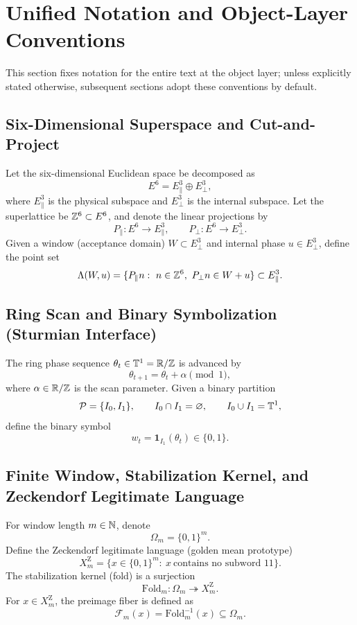\section*{Unified Notation and Object-Layer Conventions}

This section fixes notation for the entire text at the object layer; unless explicitly stated otherwise, subsequent sections adopt these conventions by default.

\subsection*{Six-Dimensional Superspace and Cut-and-Project}
Let the six-dimensional Euclidean space be decomposed as
$$
E^{6}=E_{\parallel}^{3}\oplus E_{\perp}^{3},
$$
where $E_{\parallel}^{3}$ is the physical subspace and $E_{\perp}^{3}$ is the internal subspace. Let the superlattice be $\mathbb{Z}^{6}\subset E^{6}$, and denote the linear projections by
$$
P_{\parallel}:E^{6}\to E_{\parallel}^{3},\qquad P_{\perp}:E^{6}\to E_{\perp}^{3}.
$$
Given a window (acceptance domain) $W\subset E_{\perp}^{3}$ and internal phase $u\in E_{\perp}^{3}$, define the point set
$$
\Lambda(W,u)=\{P_{\parallel}n:\ n\in\ZZ^{6},\ P_{\perp}n\in W+u\}\subset E_{\parallel}^{3}.
$$

\subsection*{Ring Scan and Binary Symbolization (Sturmian Interface)}
The ring phase sequence $\theta_t\in \mathbb{T}^1=\mathbb{R}/\mathbb{Z}$ is advanced by
$$
\theta_{t+1}=\theta_t+\alpha\pmod 1,
$$
where $\alpha\in\mathbb{R}/\mathbb{Z}$ is the scan parameter. Given a binary partition
$$
\mathcal{P}=\{I_0,I_1\},\qquad I_0\cap I_1=\varnothing,\qquad I_0\cup I_1=\mathbb{T}^1,
$$
define the binary symbol
$$
w_t=\mathbf{1}_{I_1}(\theta_t)\in\{0,1\}.
$$

\subsection*{Finite Window, Stabilization Kernel, and Zeckendorf Legitimate Language}
For window length $m\in\mathbb{N}$, denote
$$
\Omega_m=\{0,1\}^{m}.
$$
Define the Zeckendorf legitimate language (golden mean prototype)
$$
X_m^{\mathrm Z}=\{x\in\{0,1\}^{m}:\ x\ \text{contains no subword }11\}.
$$
The stabilization kernel (fold) is a surjection
$$
\mathrm{Fold}_m:\Omega_m\twoheadrightarrow X_m^{\mathrm Z}.
$$
For $x\in X_m^{\mathrm Z}$, the preimage fiber is defined as
$$
\mathcal{F}_m(x)=\mathrm{Fold}_m^{-1}(x)\subseteq \Omega_m.
$$

